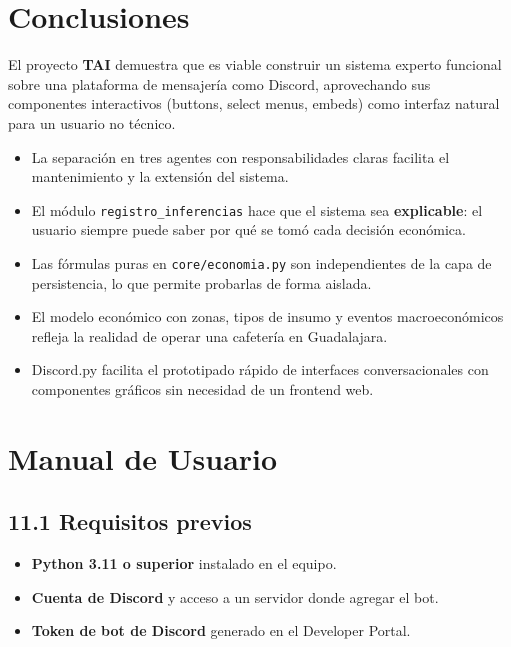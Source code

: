 \documentclass[12pt,spanish]{article}
\begin{document}
\section{Conclusiones}

El proyecto \textbf{TAI} demuestra que es viable construir un sistema experto
funcional sobre una plataforma de mensajería como Discord, aprovechando sus
componentes interactivos (buttons, select menus, embeds) como interfaz natural
para un usuario no técnico.

\begin{itemize}
  \item La separación en tres agentes con responsabilidades claras facilita el
        mantenimiento y la extensión del sistema.
  \item El módulo \texttt{registro\_inferencias} hace que el sistema sea
        \textbf{explicable}: el usuario siempre puede saber por qué se tomó
        cada decisión económica.
  \item Las fórmulas puras en \texttt{core/economia.py} son independientes de
        la capa de persistencia, lo que permite probarlas de forma aislada.
  \item El modelo económico con zonas, tipos de insumo y eventos macroeconómicos
        refleja la realidad de operar una cafetería en Guadalajara.
  \item Discord.py facilita el prototipado rápido de interfaces conversacionales
        con componentes gráficos sin necesidad de un frontend web.
\end{itemize}

\newpage

\section{Manual de Usuario}

\subsection*{11.1 Requisitos previos}

\begin{itemize}
  \item \textbf{Python 3.11 o superior} instalado en el equipo.
  \item \textbf{Cuenta de Discord} y acceso a un servidor donde agregar el bot.
  \item \textbf{Token de bot de Discord} generado en el Developer Portal.
\end{itemize}
\end{document}
